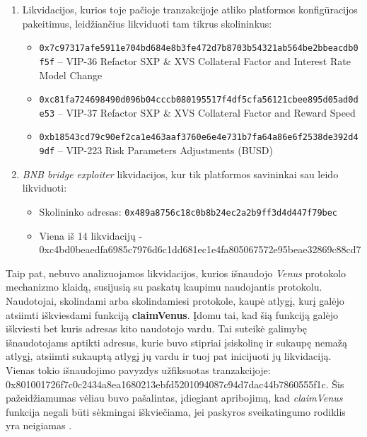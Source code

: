 \documentclass[]{VUMIFTemplateClass}
\begin{document}
\begin{enumerate}
    \item Likvidacijos, kurios toje pačioje tranzakcijoje atliko platformos konfigūracijos pakeitimus, leidžiančius likviduoti tam tikrus skolininkus:
    \begin{itemize}
        \item \texttt{0x7c97317afe5911e704bd684e8b3fe472d7b8703b54321ab564be2bbeacdb0f5f} – VIP-36 Refactor SXP \& XVS Collateral Factor and Interest Rate Model Change
        \item \texttt{0xc81fa724698490d096b04cccb080195517f4df5cfa56121cbee895d05ad0de53} – VIP-37 Refactor SXP \& XVS Collateral Factor and Reward Speed
        \item \texttt{0xb18543cd79c90ef2ca1e463aaf3760e6e4e731b7fa64a86e6f2538de392d49df} – VIP-223 Risk Parameters Adjustments (BUSD)
    \end{itemize}
    \item \textit{BNB bridge exploiter} likvidacijos, kur tik platformos savininkai sau leido likviduoti:
    \begin{itemize}
        \item Skolininko adresas: \texttt{0x489a8756c18c0b8b24ec2a2b9ff3d4d447f79bec}
        \item Viena iš 14 likvidacijų - \\0xc4bd0beaedfa6985c7976d6c1dd681ec1e4fa805067572e95beae32869c88cd7
    \end{itemize}
\end{enumerate}

Taip pat, nebuvo analizuojamos likvidacijos, kurios išnaudojo \textit{Venus} protokolo mechanizmo klaidą, susijusią su paskatų kaupimu naudojantis protokolu. Naudotojai, skolindami arba skolindamiesi protokole, kaupė atlygį, kurį galėjo atsiimti iškviesdami funkciją \textbf{claimVenus}. Įdomu tai, kad šią funkciją galėjo iškviesti bet kuris adresas kito naudotojo vardu. Tai suteikė galimybę išnaudotojams aptikti adresus, kurie buvo stipriai įsiskolinę ir sukaupę nemažą atlygį, atsiimti sukauptą atlygį jų vardu ir tuoj pat inicijuoti jų likvidaciją. Vienas tokio išnaudojimo pavyzdys užfiksuotas tranzakcijoje: 0x801001726f7c0c2434a8ea1680213ebfd5201094087c94d7dac44b7860555f1c. Šis pažeidžiamumas vėliau buvo pašalintas, įdiegiant apribojimą, kad \textit{claimVenus} funkcija negali būti sėkmingai iškviečiama, jei paskyros sveikatingumo rodiklis yra neigiamas \cite{exploitFix}.

\end{document}
